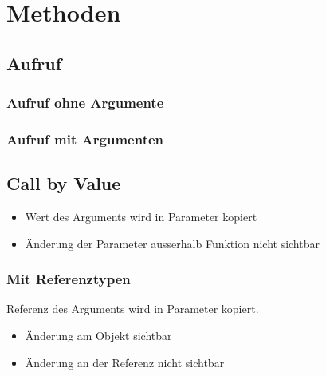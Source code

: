 \section{Methoden}
\subsection{Aufruf}\vspace{-2mm}
\begin{minipage}[t]{0.49\columnwidth}
    \subsubsection{Aufruf ohne Argumente}
\end{minipage}
\begin{minipage}[t]{0.5\columnwidth}
    \subsubsection{Aufruf mit Argumenten}
\end{minipage}

\subsection{Call by Value}
\begin{itemize}
    \item Wert des Arguments wird in Parameter kopiert
    \item Änderung der Parameter ausserhalb Funktion nicht sichtbar
\end{itemize}

\subsubsection{Mit Referenztypen}
Referenz des Arguments wird in Parameter kopiert.
\begin{itemize}
    \item Änderung am Objekt sichtbar
    \item Änderung an der Referenz nicht sichtbar
\end{itemize}\vspace{-3mm}
\begin{minipage}[t]{0.49\columnwidth}
    
\end{minipage}\hfill
\begin{minipage}[t]{0.5\columnwidth}
    
\end{minipage}

